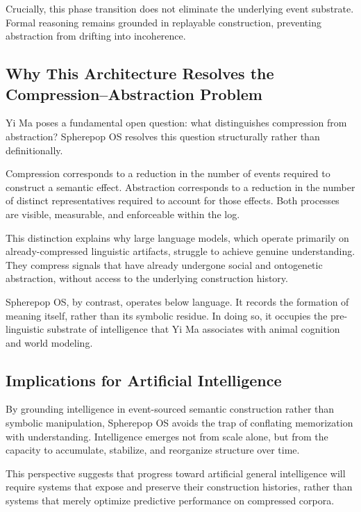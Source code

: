 \documentclass[11pt]{article}
\begin{document}
Crucially, this phase transition does not eliminate the underlying event
substrate. Formal reasoning remains grounded in replayable construction,
preventing abstraction from drifting into incoherence.

\subsection{Why This Architecture Resolves the Compression--Abstraction
Problem}

Yi Ma poses a fundamental open question: what distinguishes compression from
abstraction? Spherepop OS resolves this question structurally rather than
definitionally.

Compression corresponds to a reduction in the number of events required to
construct a semantic effect. Abstraction corresponds to a reduction in the
number of distinct representatives required to account for those effects.
Both processes are visible, measurable, and enforceable within the log.

This distinction explains why large language models, which operate primarily
on already-compressed linguistic artifacts, struggle to achieve genuine
understanding. They compress signals that have already undergone social and
ontogenetic abstraction, without access to the underlying construction
history.

Spherepop OS, by contrast, operates below language. It records the formation
of meaning itself, rather than its symbolic residue. In doing so, it occupies
the pre-linguistic substrate of intelligence that Yi Ma associates with
animal cognition and world modeling.

\subsection{Implications for Artificial Intelligence}

By grounding intelligence in event-sourced semantic construction rather than
symbolic manipulation, Spherepop OS avoids the trap of conflating memorization
with understanding. Intelligence emerges not from scale alone, but from the
capacity to accumulate, stabilize, and reorganize structure over time.

This perspective suggests that progress toward artificial general
intelligence will require systems that expose and preserve their
construction histories, rather than systems that merely optimize predictive
performance on compressed corpora.
\end{document}
